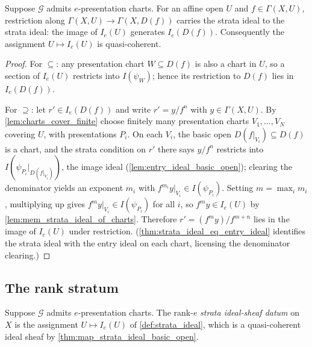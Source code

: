 \begin{theorem}
  \label{thm:map_strata_ideal_basic_open}
  \leanok
  Suppose \(\mathcal G\) admits \(e\)-presentation charts.  For an affine open
  \(U\) and \(f \in \Gamma(X, U)\), restriction along
  \(\Gamma(X, U) \to \Gamma(X, D(f))\) carries the strata ideal to the strata
  ideal: the image of \(I_e(U)\) generates \(I_e(D(f))\).  Consequently the
  assignment \(U \mapsto I_e(U)\) is quasi-coherent.
\end{theorem}

\begin{proof}
  \leanok
  For \(\subseteq\): any presentation chart \(W \subseteq D(f)\) is also a
  chart in \(U\), so a section of \(I_e(U)\) restricts into \(I(\psi_W)\);
  hence its restriction to \(D(f)\) lies in \(I_e(D(f))\).

  For \(\supseteq\): let \(r' \in I_e(D(f))\) and write
  \(r' = y / f^{n}\) with \(y \in \Gamma(X, U)\).  By
  \cref{lem:charts_cover_finite} choose finitely many presentation charts
  \(V_1, \dots, V_N\) covering \(U\), with presentations \(P_i\).  On each
  \(V_i\), the basic open \(D(f|_{V_i}) \subseteq D(f)\) is a chart, and the
  strata condition on \(r'\) there says \(y / f^{n}\) restricts into
  \(I(\psi_{P_i}|_{D(f|_{V_i})})\), the image ideal
  (\cref{lem:entry_ideal_basic_open}); clearing the denominator yields an
  exponent \(m_i\) with \(f^{m_i} y|_{V_i} \in I(\psi_{P_i})\).  Setting
  \(m = \max_i m_i\), multiplying up gives
  \(f^{m} y|_{V_i} \in I(\psi_{P_i})\) for all \(i\), so
  \(f^{m} y \in I_e(U)\) by \cref{lem:mem_strata_ideal_of_charts}.  Therefore
  \(r' = (f^{m} y) / f^{m + n}\) lies in the image of \(I_e(U)\) under
  restriction.  (\cref{thm:strata_ideal_eq_entry_ideal} identifies the strata
  ideal with the entry ideal on each chart, licensing the denominator
  clearing.)
\end{proof}

\subsection{The rank stratum}

\begin{definition}
  \label{def:strata_data}
  \leanok
  Suppose \(\mathcal G\) admits \(e\)-presentation charts.  The rank-\(e\)
  \emph{strata ideal-sheaf datum} on \(X\) is the assignment
  \(U \mapsto I_e(U)\) of \cref{def:strata_ideal}, which is a quasi-coherent
  ideal sheaf by \cref{thm:map_strata_ideal_basic_open}.
\end{definition}

